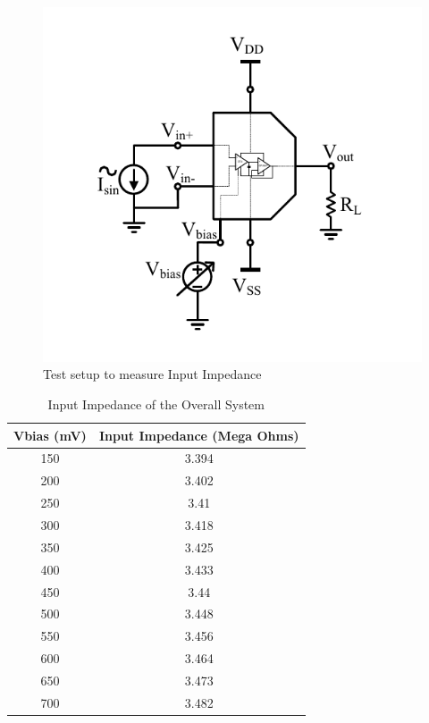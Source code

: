 \begin{figure} [H]
\centering
\includegraphics[scale=1]{Figures/Test_Benches/Overall/ZIN.pdf}
\caption{Test setup to measure Input Impedance}
\end{figure}

\begin{table} [H]
\centering
\begin{tabular}{@{}cc@{}}
\toprule
Vbias (mV)			& Input Impedance (Mega Ohms)	\\ \midrule
150					& 3.394  \\
200					& 3.402  \\
250					& 3.41   \\
300					& 3.418	 \\
350					& 3.425	 \\
400					& 3.433	 \\
450					& 3.44  \\
500					& 3.448 \\
550					& 3.456 \\
600					& 3.464 \\
650					& 3.473 \\
700 				& 3.482 \\
\bottomrule
\end{tabular}
\caption{Input Impedance of the Overall System}
\end{table}

